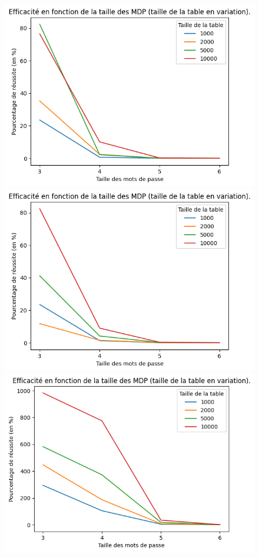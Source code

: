 \documentclass[french,12pt]{article}
\begin{document}
    



    \begin{figure}[H]
    \centering
 
      \includegraphics[scale=0.7]{img/graphe/md5/S_T_C_100000_MotGenerator.png}

    
      \includegraphics[scale=0.7]{img/graphe/sha3/S_T_C_100000_MotGenerator.png}

      \includegraphics[scale=0.7]{img/graphe/pearson/S_T_C_100000_MotGenerator.png}


\end{figure}
\end{document}
